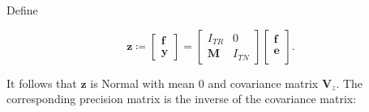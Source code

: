 \documentclass[notitlepage,a4paper,12pt]{article}
\begin{document}
Define 

\begin{equation}
    \mathbf{z} 
    \coloneqq 
    \begin{bmatrix}
        \mathbf{f} \\
        \mathbf{y}
    \end{bmatrix} 
    = 
    \begin{bmatrix}
        I_{TR} & 0 \\
        \mathbf{M} & I_{TN} 
    \end{bmatrix}
    \begin{bmatrix}
        \mathbf{f}\\
        \mathbf{e}\\
    \end{bmatrix}.
\end{equation}

It follows that $\mathbf{z}$ is Normal with mean 0 and covariance matrix $\mathbf{V}_{\!z}$. The corresponding precision matrix is the inverse of the covariance matrix: 
\end{document}
